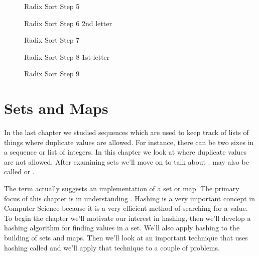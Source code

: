 \documentclass[letterpaper,10pt,english]{sphinxmanual}
\begin{document}
\begin{figure}[htbp]
\centering
\capstart

\noindent{}
\caption{Radix Sort Step 5}\label{\detokenize{chap4/chap4:id22}}\end{figure}

\begin{figure}[htbp]
\centering
\capstart

\noindent{}
\caption{Radix Sort Step 6 \sphinxhyphen{} 2nd letter}\label{\detokenize{chap4/chap4:id23}}\end{figure}

\begin{figure}[htbp]
\centering
\capstart

\noindent{}
\caption{Radix Sort Step 7}\label{\detokenize{chap4/chap4:id24}}\end{figure}

\begin{figure}[htbp]
\centering
\capstart

\noindent{}
\caption{Radix Sort Step 8 \sphinxhyphen{} 1st letter}\label{\detokenize{chap4/chap4:id25}}\end{figure}

\begin{figure}[htbp]
\centering
\capstart

\noindent{}
\caption{Radix Sort Step 9}\label{\detokenize{chap4/chap4:id26}}\end{figure}


\chapter{Sets and Maps}
\label{\detokenize{chap5/chap5:sets-and-maps}}\label{\detokenize{chap5/chap5:setsmaps}}\label{\detokenize{chap5/chap5::doc}}
In the last chapter we studied sequences which are used to keep track of lists of things where duplicate values are allowed. For instance, there can be two sixes in a sequence or list of integers. In this chapter we look at  where duplicate values are not allowed. After examining sets we’ll move on to talk about .  may also be called  or .

The term  actually suggests an implementation of a set or map. The primary focus of this chapter is in understanding . Hashing is a very important concept in Computer Science because it is a very efficient method of searching for a value. To begin the chapter we’ll motivate our interest in hashing, then we’ll develop a hashing algorithm for finding values in a set. We’ll also apply hashing to the building of sets and maps. Then we’ll look at an important technique that uses hashing called  and we’ll apply that technique to a couple of problems.
\end{document}
